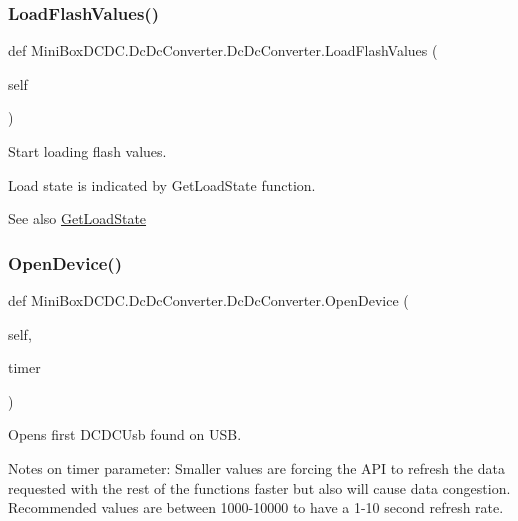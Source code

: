 \subsubsection{\texorpdfstring{Load\+Flash\+Values()}{LoadFlashValues()}}
{\footnotesize\ttfamily def Mini\+Box\+D\+C\+D\+C.\+Dc\+Dc\+Converter.\+Dc\+Dc\+Converter.\+Load\+Flash\+Values (\begin{DoxyParamCaption}\item[{}]{self }\end{DoxyParamCaption})}



Start loading flash values. 

Load state is indicated by Get\+Load\+State function.

\begin{DoxySeeAlso}{See also}
\hyperlink{class_mini_box_d_c_d_c_1_1_dc_dc_converter_1_1_dc_dc_converter_a914909cd3e115e6cb503f8af8250be16}{Get\+Load\+State} 
\end{DoxySeeAlso}
\mbox{\label{class_mini_box_d_c_d_c_1_1_dc_dc_converter_1_1_dc_dc_converter_a48fc2f6d39793c6e08b1199977f430c2}} 
\subsubsection{\texorpdfstring{Open\+Device()}{OpenDevice()}}
{\footnotesize\ttfamily def Mini\+Box\+D\+C\+D\+C.\+Dc\+Dc\+Converter.\+Dc\+Dc\+Converter.\+Open\+Device (\begin{DoxyParamCaption}\item[{}]{self,  }\item[{}]{timer }\end{DoxyParamCaption})}



Opens first D\+C\+D\+C\+Usb found on U\+SB. 

Notes on timer parameter\+: Smaller values are forcing the A\+PI to refresh the data requested with the rest of the functions faster but also will cause data congestion. Recommended values are between 1000-\/10000 to have a 1-\/10 second refresh rate.

